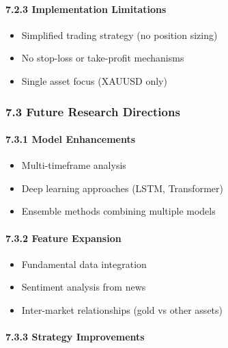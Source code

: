 \paragraph{7.2.3 Implementation
Limitations}\label{implementation-limitations}

\begin{itemize}
\tightlist
\item
  Simplified trading strategy (no position sizing)
\item
  No stop-loss or take-profit mechanisms
\item
  Single asset focus (XAUUSD only)
\end{itemize}

\subsubsection{7.3 Future Research
Directions}\label{future-research-directions}

\paragraph{7.3.1 Model Enhancements}\label{model-enhancements}

\begin{itemize}
\tightlist
\item
  Multi-timeframe analysis
\item
  Deep learning approaches (LSTM, Transformer)
\item
  Ensemble methods combining multiple models
\end{itemize}

\paragraph{7.3.2 Feature Expansion}\label{feature-expansion}

\begin{itemize}
\tightlist
\item
  Fundamental data integration
\item
  Sentiment analysis from news
\item
  Inter-market relationships (gold vs other assets)
\end{itemize}

\paragraph{7.3.3 Strategy Improvements}\label{strategy-improvements}

